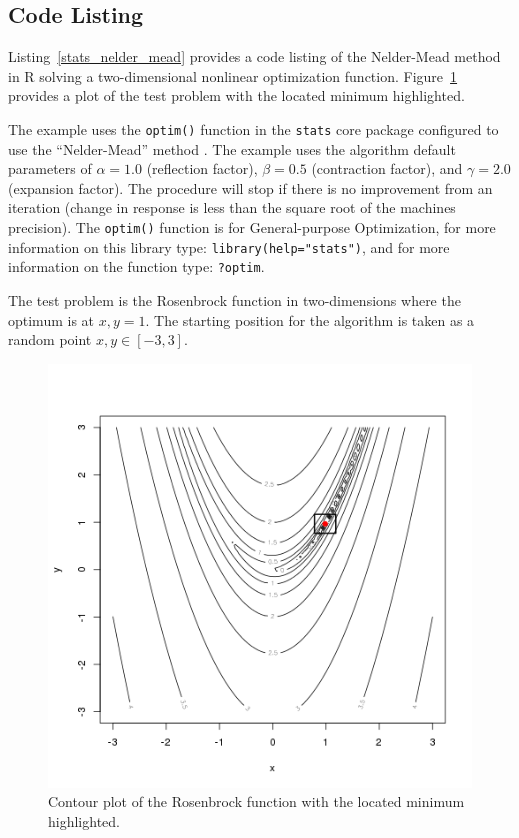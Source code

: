 \subsection{Code Listing}
Listing~\ref{stats_nelder_mead} provides a code listing of the Nelder-Mead method in R solving a two-dimensional nonlinear optimization function. Figure~\ref{plot:nelder_mead_result} provides a plot of the test problem with the located minimum highlighted.

The example uses the \texttt{optim()} function in the \texttt{stats} core package configured to use the ``Nelder-Mead'' method \cite{RDCT2011a}. The example uses the algorithm default parameters of $\alpha=1.0$ (reflection factor), $\beta=0.5$ (contraction factor), and $\gamma=2.0$ (expansion factor). The procedure will stop if there is no improvement from an iteration (change in response is less than the square root of the machines precision). The \texttt{optim()} function is for General-purpose Optimization, for more information on this library type: \texttt{library(help="stats")}, and for more information on the function type: \texttt{?optim}.

The test problem is the Rosenbrock function in two-dimensions where the optimum is at $x,y=1$. The starting position for the algorithm is taken as a random point $x,y \in [-3,3]$.



\begin{figure}[htp]
\centering
\includegraphics[scale=0.45]{a_optimization/nelder_mead_result.png}
\caption{Contour plot of the Rosenbrock function with the located minimum highlighted.}
\label{plot:nelder_mead_result}
\end{figure}

